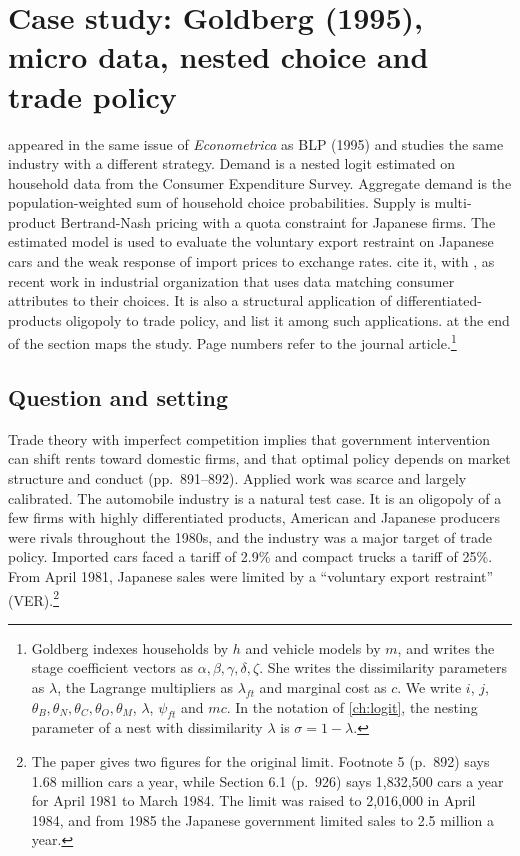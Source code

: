 \section{Case study: Goldberg (1995), micro data, nested choice and trade policy}\label{sec:08-goldberg}

\citet{Goldberg1995} appeared in the same issue of \emph{Econometrica} as BLP (1995) and studies the same
industry with a different strategy. Demand is a nested logit estimated on household data from the Consumer
Expenditure Survey. Aggregate demand is the population-weighted sum of household choice probabilities. Supply is
multi-product Bertrand-Nash pricing with a quota constraint for Japanese firms. The estimated model is used to
evaluate the voluntary export restraint on Japanese cars and the weak response of import prices to exchange
rates. \citet[p.~70]{BerryLevinsohnPakes2004} cite it, with \citet{Petrin2002}, as recent work in industrial
organization that uses data matching consumer attributes to their choices. It is also a structural application of
differentiated-products oligopoly to trade policy, and \citet[p.~1749, n.~2]{BerryHaile2014} list it among
such applications.  at the end of the section maps the study. Page numbers
refer to the journal article.\footnote{Goldberg indexes households by $h$ and vehicle models by $m$, and writes the stage
coefficient vectors as $\alpha, \beta, \gamma, \delta, \zeta$. She writes the dissimilarity parameters as
$\lambda$, the Lagrange multipliers as $\lambda_{ft}$ and marginal cost as $c$. We write $i$, $j$, $\theta_B, \theta_N,
\theta_C, \theta_O, \theta_M$, $\lambda$, $\psi_{ft}$ and $mc$. In the notation of \cref{ch:logit}, the nesting
parameter of a nest with dissimilarity $\lambda$ is $\sigma = 1 - \lambda$.}

\subsection{Question and setting}\label{sec:08-goldberg-question}

Trade theory with imperfect competition implies that government intervention can shift rents toward domestic
firms, and that optimal policy depends on market structure and conduct (pp.~891--892). Applied work was scarce
and largely calibrated. The automobile industry is a natural test case. It is an oligopoly of a few firms with
highly differentiated products, American and Japanese producers were rivals throughout the 1980s, and the
industry was a major target of trade policy. Imported cars faced a tariff of 2.9\% and compact trucks a tariff
of 25\%. From April 1981, Japanese sales were limited by a ``voluntary export restraint'' (VER).\footnote{The
paper gives two figures for the original limit. Footnote 5 (p.~892) says 1.68 million cars a year, while
Section 6.1 (p.~926) says 1,832,500 cars a year for April 1981 to March 1984. The limit was raised to
2,016,000 in April 1984, and from 1985 the Japanese government limited sales to 2.5 million a year.}


